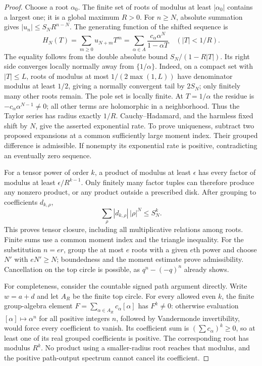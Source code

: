 \documentclass[11pt,a4paper]{article}
\theoremstyle{named}\newtheorem{finding}{Finding}[section]
\theoremstyle{definition}\newtheorem{definition}[finding]{Definition}
\theoremstyle{remark}\newtheorem{remark}[finding]{Remark}
\begin{document}
\begin{proof}
Choose a root $\alpha_0$. The finite set of roots of modulus at least
$|\alpha_0|$ contains a largest one; it is a global maximum $R>0$.
For $n\ge N$, absolute summation gives $|u_n|\le S_NR^{n-N}$.
The generating function of the shifted sequence is
\[
 H_N(T)=\sum_{m\ge0}u_{N+m}T^m
       =\sum_{\alpha\in A}\frac{c_\alpha\alpha^N}{1-\alpha T}
       \quad (|T|<1/R).
\]
The equality follows from the double absolute bound
$S_N/(1-R|T|)$. Its right side converges locally normally away from
$\{1/\alpha\}$. Indeed, on a compact set with $|T|\le L$, roots
of modulus at most $1/(2\max(1,L))$ have denominator modulus at
least $1/2$, giving a normally convergent tail by $2S_N$; only
finitely many other roots remain. The pole set is locally finite.
At $T=1/\alpha$ the residue is
$-c_\alpha\alpha^{N-1}\ne0$; all other terms are holomorphic in a
neighborhood. Thus the Taylor series has radius exactly $1/R$.
Cauchy--Hadamard, and the harmless fixed shift by $N$, give the
asserted exponential rate. To prove uniqueness, subtract two proposed
expansions at a common sufficiently large moment index. Their grouped
difference is admissible. If nonempty its exponential rate is positive,
contradicting an eventually zero sequence.

For a tensor power of order $k$, a product of modulus at least
$\epsilon$ has every factor of modulus at least
$\epsilon/R^{k-1}$. Only finitely many factor tuples can therefore
produce any nonzero product, or any product outside a prescribed disk.
After grouping to coefficients $d_{k,\rho}$,
\[
 \sum_\rho |d_{k,\rho}|\,|\rho|^N\le S_N^k.
\]
This proves tensor closure, including all multiplicative relations
among roots. Finite sums use a common moment index and the triangle
inequality. For the substitution $n=er$, group the at most $e$ roots
with a given $e$th power and choose $N'$ with $eN'\ge N$; boundedness
and the moment estimate prove admissibility. Cancellation on the top
circle is possible, as $q^n-(-q)^n$ already shows.

For completeness, consider the countable signed path argument directly.
Write $w=a+d$ and let $A_R$ be the finite top circle. For every allowed
even $k$, the finite group-algebra element
$F=\sum_{\alpha\in A_R}c_\alpha[\alpha]$ has
$F^k\ne0$: otherwise evaluation $[\alpha]\mapsto\alpha^n$ for
all positive integers $n$, followed by Vandermonde invertibility,
would force every coefficient to vanish. Its coefficient sum is
$(\sum c_\alpha)^k\ge0$, so at least one of its real grouped
coefficients is positive. The corresponding root has modulus $R^k$.
No product using a smaller-radius root reaches that modulus, and the
positive path-output spectrum cannot cancel its coefficient.


\end{proof}
\end{document}
